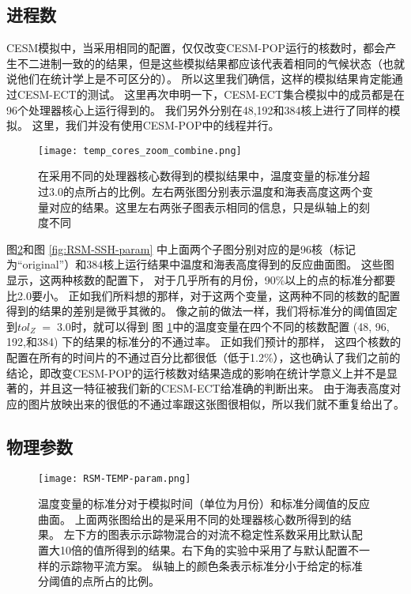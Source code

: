 \subsection{进程数}\label{verify:proc}

 
CESM模拟中，当采用相同的配置，仅仅改变CESM-POP运行的核数时，都会产生不二进制一致的的结果，但是这些模拟结果都应该代表着相同的气候状态（也就说他们在统计学上是不可区分的）。
所以这里我们确信，这样的模拟结果肯定能通过CESM-ECT的测试。 
这里再次申明一下，CESM-ECT集合模拟中的成员都是在96个处理器核心上运行得到的。
我们另外分别在48,192和384核上进行了同样的模拟。
这里，我们并没有使用CESM-POP中的线程并行。 


\begin{figure}
\centering
\texttt{[image: temp\_cores\_zoom\_combine.png]}
\caption{
在采用不同的处理器核心数得到的模拟结果中，温度变量的标准分超过3.0的点所占的比例。左右两张图分别表示温度和海表高度这两个变量对应的结果。这里左右两张子图表示相同的信息，只是纵轴上的刻度不同}
\label {fig:combine}
\end{figure}
 
图\ref{fig:RSM-TEMP-param}和图 \ref{fig:RSM-SSH-param} 中上面两个子图分别对应的是96核（标记为“original”）和384核上运行结果中温度和海表高度得到的反应曲面图。 
这些图显示，这两种核数的配置下， 对于几乎所有的月份，90\%以上的点的标准分都要比2.0要小。 
正如我们所料想的那样，对于这两个变量，这两种不同的核数的配置得到的结果的差别是微乎其微的。
像之前的做法一样，我们将标准分的阈值固定到$tol_{Z} \; = \; 3.0$时，就可以得到 图 \ref{fig:combine}中的温度变量在四个不同的核数配置 (48, 96, 192,和384) 下的结果的标准分的不通过率。
正如我们预计的那样， 这四个核数的配置在所有的时间片的不通过百分比都很低（低于1.2\%），这也确认了我们之前的结论，即改变CESM-POP的运行核数对结果造成的影响在统计学意义上并不是显著的，并且这一特征被我们新的CESM-ECT给准确的判断出来。 
由于海表高度对应的图片放映出来的很低的不通过率跟这张图很相似，所以我们就不重复给出了。

 \subsection{物理参数}\label{verify:pp}

\begin {figure} 
\centering
\texttt{[image: RSM-TEMP-param.png]}
\caption {
温度变量的标准分对于模拟时间（单位为月份）和标准分阈值的反应曲面。
上面两张图给出的是采用不同的处理器核心数所得到的结果。
左下方的图表示示踪物混合的对流不稳定性系数采用比默认配置大10倍的值所得到的结果。右下角的实验中采用了与默认配置不一样的示踪物平流方案。
纵轴上的颜色条表示标准分小于给定的标准分阈值的点所占的比例。}
\label{fig:RSM-TEMP-param}
\end {figure}


